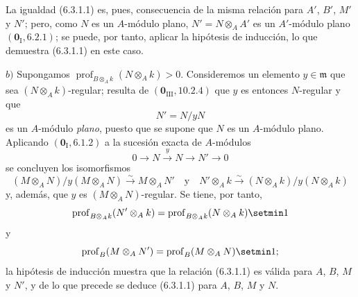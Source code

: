 La igualdad (6.3.1.1) es, pues, consecuencia de la misma relación para $A'$,
$B'$, $M'$ y $N'$; pero, como $N$ es un $A$-módulo plano,
$N'=N\otimes_AA'$ es un $A'$-módulo plano $(\mathbf{0}_{\mathrm I}, 6.2.1)$; se puede,
por tanto, aplicar la hipótesis de inducción, lo que demuestra (6.3.1.1) en
este caso.

$b)$ Supongamos $\operatorname{prof}_{B\otimes_Ak}(N\otimes_Ak)>0$.
Consideremos un elemento $y\in\mathfrak m$ que sea
$(N\otimes_Ak)$-regular; resulta de $(\mathbf{0}_{\mathrm{III}}, 10.2.4)$ que $y$ es
entonces $N$-regular y que
\[
N'=N/yN
\]
es un $A$-módulo \emph{plano}, puesto que se supone que $N$ es un $A$-módulo plano.
Aplicando $(\mathbf{0}_{\mathrm I}, 6.1.2)$ a la sucesión exacta de $A$-módulos
\[
0\to N\xrightarrow{y}N\to N'\to0
\]
se concluyen los isomorfismos
\[
(M\otimes_AN)/y(M\otimes_AN)\xrightarrow{\sim}M\otimes_AN'
\quad\text{y}\quad
N'\otimes_Ak\xrightarrow{\sim}(N\otimes_Ak)/y(N\otimes_Ak)
\]
y, además, que $y$ es $(M\otimes_AN)$-regular. Se tiene, por tanto,
\[
\operatorname{prof}_{B\otimes_Ak}(N'\otimes_Ak)
=\operatorname{prof}_{B\otimes_Ak}(N\otimes_Ak)\setmin 1
\]
y
\[
\operatorname{prof}_B(M\otimes_AN')
=\operatorname{prof}_B(M\otimes_AN)\setmin 1;
\]
la hipótesis de inducción muestra que la relación (6.3.1.1) es válida para
$A$, $B$, $M$ y $N'$, y de lo que precede se deduce (6.3.1.1) para $A$, $B$,
$M$ y $N$.
